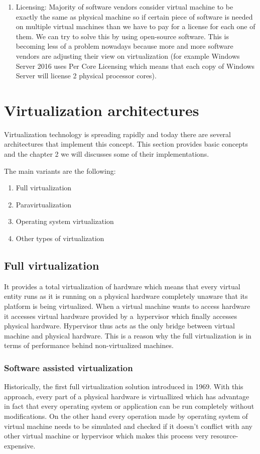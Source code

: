 \begin{enumerate}
\item Licensing: Majority of software vendors consider virtual machine to be exactly the same as physical machine so if certain piece of software is needed on multiple virtual machines than we have to pay for a license for each one of them. We can try to solve this by using open-source software. This is becoming less of a problem nowadays because more and more software vendors are adjusting their view on virtualization (for example Windows Server 2016 uses Per Core Licensing which means that each copy of Windows Server will license 2 physical processor cores).
\end{enumerate}

\section{Virtualization architectures}
Virtualization technology is spreading rapidly and today there are several architectures that implement this concept. This section provides basic concepts and the chapter 2 we will discusses some of their implementations.

The main variants are the following:
\begin{enumerate}
\item Full virtualization
\item Paravirtualization
\item Operating system virtualization
\item Other types of virtualization
\end{enumerate}

\subsection{Full virtualization} 
\label{full_virt}
It provides a total virtualization of hardware which means that every virtual entity runs as it is running on a physical hardware completely unaware that its platform is being virtualized. When a virtual machine wants to access hardware it accesses virtual hardware provided by a~hypervisor which finally accesses physical hardware. Hypervisor thus acts as the only bridge between virtual machine and physical hardware. This is a reason why the full virtualization is in terms of performance behind non-virtualized machines.
\subsubsection{Software assisted virtualization}
Historically, the first full virtualization solution introduced in 1969. With this approach, every part of a physical hardware is virtuallized which has advantage in fact that every operating system or application can be run completely without modifications. On the other hand every operation made by operating system of virtual machine needs to be simulated and checked if it doesn't conflict with any other virtual machine or hypervisor \cite{sec_and_virt:survey} which makes this process very resource-expensive.

